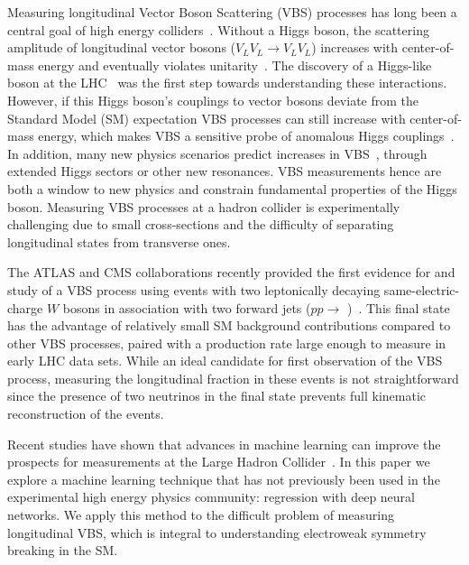 
Measuring longitudinal Vector Boson Scattering (VBS) processes has
long been a central goal of high energy
colliders~\cite{SSC_1}. Without a Higgs boson, the scattering
amplitude of longitudinal vector bosons ($V_{L}V_{L} \rightarrow
V_{L}V_{L}$) increases with center-of-mass energy and eventually
violates unitarity~\cite{Uni_1,Uni_2,Uni_3}. The discovery of a
Higgs-like boson at the LHC~\cite{ATLAS_higgs,CMS_higgs} was the first
step towards understanding these interactions. However, if this Higgs
boson's couplings to vector bosons deviate from the Standard Model
(SM) expectation VBS processes can still increase with center-of-mass
energy, which makes VBS a sensitive probe of anomalous Higgs
couplings~\cite{Higgs_con}. In addition, many new physics scenarios
predict increases in
VBS~\cite{Tmatrix,VLVLBSM,Trip_Higgs_old,Trip_higgs_new}, through
extended Higgs sectors or other new resonances. VBS measurements hence
are both a window to new physics and constrain fundamental properties
of the Higgs boson. Measuring VBS processes at a hadron collider is
experimentally challenging due to small cross-sections and the
difficulty of separating longitudinal states from transverse ones.

The ATLAS and CMS collaborations recently provided the first evidence
for and study of a VBS process using events with two leptonically
decaying same-electric-charge $W$ bosons in association with two
forward jets ($pp \to$ \ssWW)~\cite{ATLAS_ssWW,CMS_ssWW}. This final
state has the advantage of relatively small SM background
contributions compared to other VBS processes, paired with a
production rate large enough to measure in early LHC data sets.  While
an ideal candidate for first observation of the VBS process, measuring
the longitudinal fraction in these events is not straightforward since
the presence of two neutrinos in the final state prevents full
kinematic reconstruction of the events.

Recent studies have shown that advances in machine learning can
improve the prospects for measurements at the Large Hadron
Collider~\cite{Baldi:2014kfa,Baldi:2014pta}.  In this paper we explore
a machine learning technique that has not previously been used in the
experimental high energy physics community: regression with deep
neural networks. We apply this method to the difficult problem of
measuring longitudinal VBS, which is integral to understanding
electroweak symmetry breaking in the SM.


